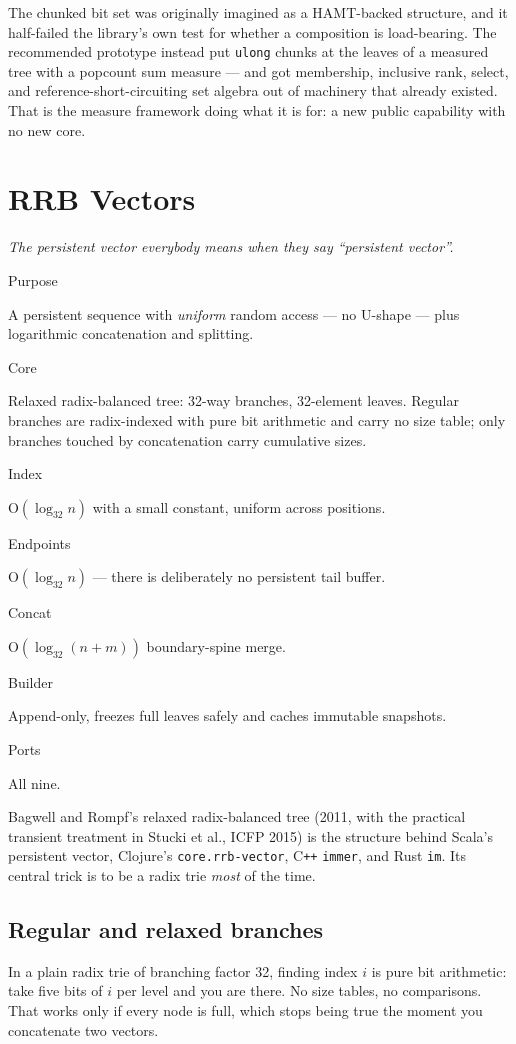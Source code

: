 \documentclass[11pt,twoside,openright]{book}
\newcommand{\code}[1]{\texorpdfstring{\textcolor{d7ink}{\texttt{#1}}}{#1}}
\newcommand{\bigoh}[1]{$\mathrm{O}(#1)$}
\newcommand{\motto}[1]{%
  \begingroup
  \vspace{-4pt}\hfill\begin{minipage}{0.80\textwidth}
    \raggedleft\itshape\color{d7slate}\small #1\par
  \end{minipage}\par\vspace{18pt}
  \endgroup}
\newcommand{\spec}[2]{%
  \par\noindent
  \parbox[t]{0.21\linewidth}{\raggedright\sffamily\bfseries\footnotesize
    \color{d7slate}\strut #1}%
  \hspace{9pt}%
  \parbox[t]{\dimexpr0.79\linewidth-9pt\relax}{\raggedright\strut #2}%
  \par\vspace{3.5pt}}
\newenvironment{specimen}[1][Specimen]
  {\begin{glancebox}[#1]\small\setlength{\parindent}{0pt}}
  {\end{glancebox}}
\begin{document}
\begin{asidebox}
The chunked bit set was originally imagined as a HAMT-backed structure, and it
half-failed the library's own test for whether a composition is load-bearing.
The recommended prototype instead put \code{ulong} chunks at the leaves of a
measured tree with a popcount sum measure --- and got membership, inclusive
rank, select, and reference-short-circuiting set algebra out of machinery that
already existed. That is the measure framework doing what it is for: a new
public capability with no new core.
\end{asidebox}

\chapter{RRB Vectors}
\label{ch:rrb}

\motto{The persistent vector everybody means when they say ``persistent
vector''.}

\begin{specimen}[Specimen --- \code{RrbVector}]
\spec{Purpose}{A persistent sequence with \emph{uniform} random access --- no U-shape --- plus logarithmic concatenation and splitting.}
\spec{Core}{Relaxed radix-balanced tree: 32-way branches, 32-element leaves. Regular branches are radix-indexed with pure bit arithmetic and carry no size table; only branches touched by concatenation carry cumulative sizes.}
\spec{Index}{\bigoh{\log_{32} n} with a small constant, uniform across positions.}
\spec{Endpoints}{\bigoh{\log_{32} n} --- there is deliberately no persistent tail buffer.}
\spec{Concat}{\bigoh{\log_{32}(n+m)} boundary-spine merge.}
\spec{Builder}{Append-only, freezes full leaves safely and caches immutable snapshots.}
\spec{Ports}{All nine.}
\end{specimen}

\noindent
Bagwell and Rompf's relaxed radix-balanced tree (2011, with the practical
transient treatment in Stucki et al., ICFP 2015) is the structure behind Scala's
persistent vector, Clojure's \code{core.rrb-vector}, C\texttt{++} \code{immer},
and Rust \code{im}. Its central trick is to be a radix trie \emph{most} of the
time.

\section{Regular and relaxed branches}

In a plain radix trie of branching factor 32, finding index $i$ is pure bit
arithmetic: take five bits of $i$ per level and you are there. No size tables, no
comparisons. That works only if every node is full, which stops being true the
moment you concatenate two vectors.
\end{document}
